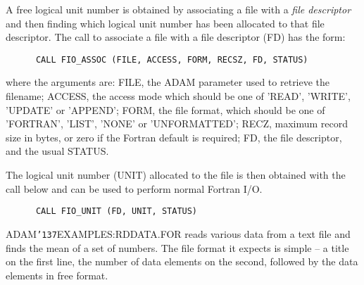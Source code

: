 \documentclass[twoside,11pt]{article}
\renewcommand{\_}{{\tt\char'137}}
\begin{document}
A free logical unit number is obtained by associating a file with a {\sl file
descriptor\/} and then finding which logical unit number has been allocated to
that file descriptor.
The call to associate a file with a file descriptor (FD) has the form:
\begin{verbatim}
      CALL FIO_ASSOC (FILE, ACCESS, FORM, RECSZ, FD, STATUS)
\end{verbatim}
where the arguments are: FILE, the ADAM parameter used to retrieve the
filename; ACCESS, the access mode which should be one
of 'READ', 'WRITE', 'UPDATE' or 'APPEND';
FORM, the file format, which should be one of 'FORTRAN', 'LIST', 'NONE'
or 'UNFORMATTED';
RECZ, maximum record size in bytes, or zero if the Fortran default is required;
FD, the file descriptor, and the usual STATUS.

The logical unit number (UNIT) allocated to the file is then obtained with the
call below and can be used to perform normal Fortran I/O.
\begin{verbatim}
      CALL FIO_UNIT (FD, UNIT, STATUS)
\end{verbatim}

ADAM\_EXAMPLES:RDDATA.FOR reads various data from a text file and finds the
mean of a set of numbers.
The file format it expects is simple -- a title on the
first line, the number of data elements on the second, followed by the
data elements in free format.
\end{document}
